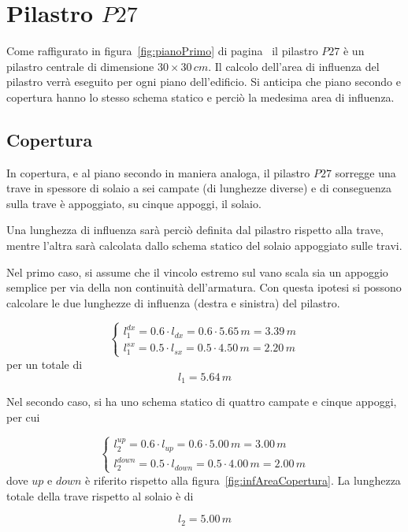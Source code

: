 \section{Pilastro $P27$}\label{sec:p27}

Come raffigurato in figura~\ref{fig:pianoPrimo} di pagina~\pageref{fig:pianoPrimo} il pilastro $P27$ è un pilastro centrale di dimensione $30\times 30\,cm$. Il calcolo dell'area di influenza del pilastro verrà eseguito per ogni piano dell'edificio. Si anticipa che piano secondo e copertura hanno lo stesso schema statico e perciò la medesima area di influenza.

\subsection{Copertura}

In copertura, e al piano secondo in maniera analoga, il pilastro $P27$ sorregge una trave in spessore di solaio a sei campate (di lunghezze diverse) e di conseguenza sulla trave è appoggiato, su cinque appoggi, il solaio. 

Una lunghezza di influenza sarà perciò definita dal pilastro rispetto alla trave, mentre l'altra sarà calcolata dallo schema statico del solaio appoggiato sulle travi. 

Nel primo caso, si assume che il vincolo estremo sul vano scala sia un appoggio semplice per via della non continuità dell'armatura. Con questa ipotesi si possono calcolare le due lunghezze di influenza (destra e sinistra) del pilastro.

\[
	\begin{cases}
		l_1^{dx} = 0.6\cdot l_{dx} = 0.6\cdot 5.65\,m = 3.39\,m\\
		l_1^{sx} = 0.5\cdot l_{sx} = 0.5\cdot 4.50\,m = 2.20\,m
	\end{cases}
\]
per un totale di
\[
	l_1 = 5.64\,m
\]

Nel secondo caso, si ha uno schema statico di quattro campate e cinque appoggi, per cui

\[
	\begin{cases}
		l_2^{up} = 0.6\cdot l_{up} = 0.6\cdot 5.00\,m = 3.00\,m\\
		l_2^{down} = 0.5\cdot l_{down} = 0.5\cdot 4.00\,m = 2.00\,m
	\end{cases}
\]
dove $up$ e $down$ è riferito rispetto alla figura~\ref{fig:infAreaCopertura}. La lunghezza totale della trave rispetto al solaio è di

\[
	l_2 = 5.00\,m
\]


